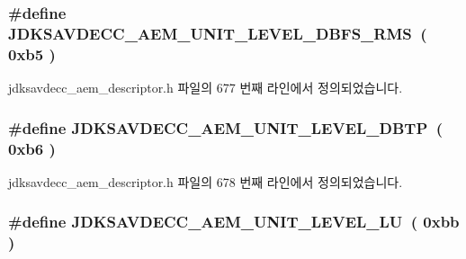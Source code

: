 \subsubsection[{\texorpdfstring{J\+D\+K\+S\+A\+V\+D\+E\+C\+C\+\_\+\+A\+E\+M\+\_\+\+U\+N\+I\+T\+\_\+\+L\+E\+V\+E\+L\+\_\+\+D\+B\+F\+S\+\_\+\+R\+MS}{JDKSAVDECC_AEM_UNIT_LEVEL_DBFS_RMS}}]{\setlength{\rightskip}{0pt plus 5cm}\#define J\+D\+K\+S\+A\+V\+D\+E\+C\+C\+\_\+\+A\+E\+M\+\_\+\+U\+N\+I\+T\+\_\+\+L\+E\+V\+E\+L\+\_\+\+D\+B\+F\+S\+\_\+\+R\+MS~( 0xb5 )}\hypertarget{group__units_gabc73964b3ec2eed7341890e291c84143}{}\label{group__units_gabc73964b3ec2eed7341890e291c84143}


jdksavdecc\+\_\+aem\+\_\+descriptor.\+h 파일의 677 번째 라인에서 정의되었습니다.

\subsubsection[{\texorpdfstring{J\+D\+K\+S\+A\+V\+D\+E\+C\+C\+\_\+\+A\+E\+M\+\_\+\+U\+N\+I\+T\+\_\+\+L\+E\+V\+E\+L\+\_\+\+D\+B\+TP}{JDKSAVDECC_AEM_UNIT_LEVEL_DBTP}}]{\setlength{\rightskip}{0pt plus 5cm}\#define J\+D\+K\+S\+A\+V\+D\+E\+C\+C\+\_\+\+A\+E\+M\+\_\+\+U\+N\+I\+T\+\_\+\+L\+E\+V\+E\+L\+\_\+\+D\+B\+TP~( 0xb6 )}\hypertarget{group__units_ga0af3e14c9b5e77935d8ad7b4dc6e4e02}{}\label{group__units_ga0af3e14c9b5e77935d8ad7b4dc6e4e02}


jdksavdecc\+\_\+aem\+\_\+descriptor.\+h 파일의 678 번째 라인에서 정의되었습니다.

\subsubsection[{\texorpdfstring{J\+D\+K\+S\+A\+V\+D\+E\+C\+C\+\_\+\+A\+E\+M\+\_\+\+U\+N\+I\+T\+\_\+\+L\+E\+V\+E\+L\+\_\+\+LU}{JDKSAVDECC_AEM_UNIT_LEVEL_LU}}]{\setlength{\rightskip}{0pt plus 5cm}\#define J\+D\+K\+S\+A\+V\+D\+E\+C\+C\+\_\+\+A\+E\+M\+\_\+\+U\+N\+I\+T\+\_\+\+L\+E\+V\+E\+L\+\_\+\+LU~( 0xbb )}\hypertarget{group__units_ga47a5bbb20e1819ca15f24030f4cbeb85}{}\label{group__units_ga47a5bbb20e1819ca15f24030f4cbeb85}


